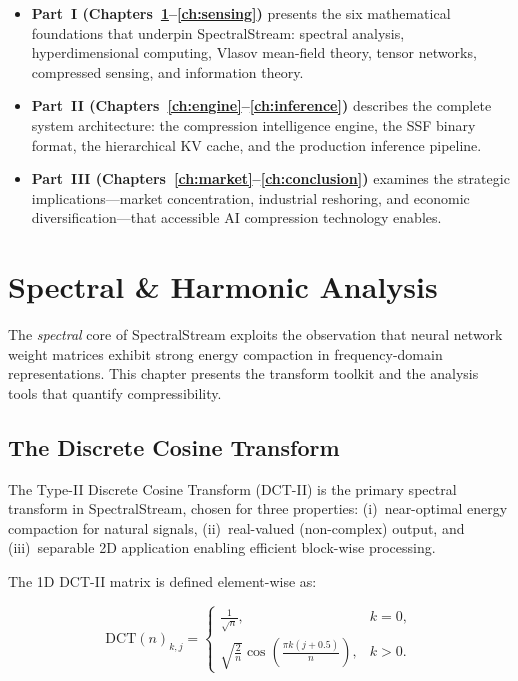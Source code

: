 \documentclass[11pt,a4paper,openright]{book}
\begin{document}
\begin{itemize}
	\item \textbf{Part~I (Chapters~\ref{ch:spectral}--\ref{ch:sensing})} presents the six mathematical foundations that underpin SpectralStream: spectral analysis, hyperdimensional computing, Vlasov mean-field theory, tensor networks, compressed sensing, and information theory.
	\item \textbf{Part~II (Chapters~\ref{ch:engine}--\ref{ch:inference})} describes the complete system architecture: the compression intelligence engine, the SSF binary format, the hierarchical KV cache, and the production inference pipeline.
	\item \textbf{Part~III (Chapters~\ref{ch:market}--\ref{ch:conclusion})} examines the strategic implications---market concentration, industrial reshoring, and economic diversification---that accessible AI compression technology enables.
\end{itemize}

\chapter{Spectral \& Harmonic Analysis}
\label{ch:spectral}

The \emph{spectral} core of SpectralStream exploits the observation that neural network weight matrices exhibit strong energy compaction in frequency-domain representations. This chapter presents the transform toolkit and the analysis tools that quantify compressibility.

\section{The Discrete Cosine Transform}

The Type-II Discrete Cosine Transform (DCT-II) is the primary spectral transform in SpectralStream, chosen for three properties: (i)~near-optimal energy compaction for natural signals, (ii)~real-valued (non-complex) output, and (iii)~separable 2D application enabling efficient block-wise processing.

The 1D DCT-II matrix is defined element-wise as:

\begin{equation}
	\label{eq:dct2}
	\text{DCT}(n)_{k,j} =
	\begin{cases}
		\displaystyle\frac{1}{\sqrt{n}},                                         & k = 0, \\[6pt]
		\displaystyle\sqrt{\frac{2}{n}}\cos\left(\frac{\pi k (j+0.5)}{n}\right), & k > 0.
	\end{cases}
\end{equation}
\end{document}
